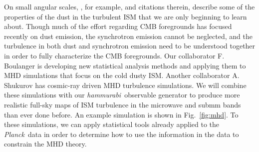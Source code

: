 \documentclass[12pt]{article}
\newcommand{\planck}{\textit{Planck}}
\newcommand{\wmap}{\textit{WMAP}}
\newcommand{\imagineSW}{\textsl{IMAGINE}}
\newcommand{\hammurabi}{\textsl{hammurabi}}
\begin{document}


On small angular scales, \citet{pipLIV}, for example, and citations therein, describe some of the properties of the dust in the turbulent ISM that we are only beginning to learn about. 
Though much of the effort regarding CMB foregrounds has focused recently on dust emission, the synchrotron emission cannot be neglected, and the turbulence in both dust and synchrotron emission need to be understood together in order to fully characterize the CMB foregrounds.  Our collaborator F. Boulanger is developing new statistical analysis methods and applying them to MHD simulations that focus on the cold dusty ISM.  Another collaborator A. Shukurov has cosmic-ray driven MHD turbulence simulations. We will combine these simulations with our \hammurabi\ observable generator \citep{waelkens:2009} to produce more realistic full-sky maps of ISM turbulence in the microwave and submm bands than ever done before. An example simulation is shown in Fig.~\ref{fig:mhd}. To these simulations, we can apply statistical tools already applied to the \planck\ data in order to determine how to use the information in the data to constrain the MHD theory. 
\end{document}

